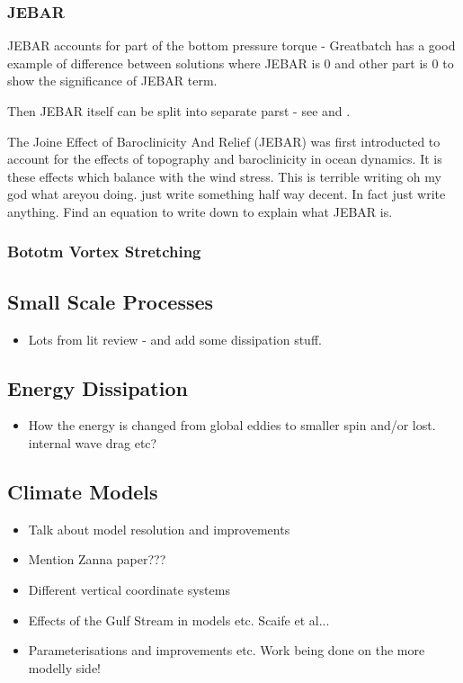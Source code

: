 \documentclass[..\EOYR.tex]{subfiles}
\begin{document}
\subsubsection*{JEBAR}
\citep{Greatbatch1991} JEBAR accounts for part of the bottom pressure torque - Greatbatch has a good example of difference between solutions where JEBAR is 0 and other part is 0 to show the significance of JEBAR term.

Then JEBAR itself can be split into separate parst - see \citep{Greatbatch1991} and \citep{Gula2014}.\\



The Joine Effect of Baroclinicity And Relief (JEBAR) was first introducted to account for the effects of topography and baroclinicity in ocean dynamics. It is these effects which balance with the wind stress. This is terrible writing oh my god what areyou doing. just write something half way decent. In fact just write anything. Find an equation to write down to explain what JEBAR is.

\subsubsection*{Bototm Vortex Stretching}

\subsection{Small Scale Processes}
\begin{itemize}
    \item Lots from lit review - and add some dissipation stuff.
\end{itemize}

\subsection{Energy Dissipation}
\begin{itemize}
    \item How the energy is changed from global eddies to smaller spin and/or lost. internal wave drag etc?
\end{itemize}

\subsection{Climate Models}
\begin{itemize}
    \item Talk about model resolution and improvements
    \item Mention Zanna paper???
    \item Different vertical coordinate systems
    \item Effects of the Gulf Stream in models etc. Scaife et al...
    \item Parameterisations and improvements etc. Work being done on the more modelly side!
\end{itemize}
\end{document}
